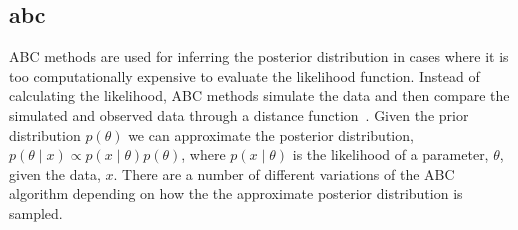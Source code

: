 \subsection{\acrfull{abc}}
\label{sec:abc}


ABC methods are used for inferring the posterior distribution in cases where it is too computationally expensive to evaluate the likelihood function. Instead of calculating the likelihood, ABC methods simulate the data and then compare the simulated and observed data through a distance function~\autocite{Toni:2009tr}. Given the prior distribution $p(\theta)$ we can approximate the posterior distribution, $p(\theta\mid x)\propto p(x\mid\theta)p(\theta)$, where $p(x\mid\theta)$ is the likelihood of a parameter, $\theta$, given the data, $x$. There are a number of different variations of the ABC algorithm depending on how the the approximate posterior distribution is sampled. 

